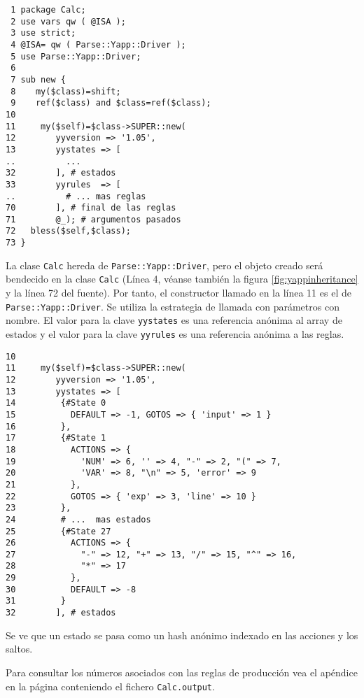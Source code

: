 \begin{verbatim}
 1 package Calc;
 2 use vars qw ( @ISA );
 3 use strict;
 4 @ISA= qw ( Parse::Yapp::Driver );
 5 use Parse::Yapp::Driver;
 6 
 7 sub new {
 8    my($class)=shift;
 9    ref($class) and $class=ref($class);
10 
11     my($self)=$class->SUPER::new( 
12        yyversion => '1.05',
13        yystates => [ 
..          ...
32        ], # estados
33        yyrules  => [
..       	# ... mas reglas
70        ], # final de las reglas
71        @_); # argumentos pasados
72   bless($self,$class);
73 }
\end{verbatim}

La clase \verb|Calc| hereda de \verb|Parse::Yapp::Driver|, pero el objeto creado
será bendecido en la clase \verb|Calc| (Línea 4, véanse también 
la figura \ref{fig:yappinheritance} 
y la línea 72 del fuente). 
Por tanto, el constructor llamado en la línea 11 es el de \verb|Parse::Yapp::Driver|.
Se utiliza la estrategia de llamada con parámetros con nombre. 
El valor para la clave \verb|yystates| es una referencia anónima 
al array de estados y el valor para la clave \verb|yyrules| 
es una referencia anónima a las reglas.
\begin{verbatim}
10 
11     my($self)=$class->SUPER::new( 
12        yyversion => '1.05',
13        yystates => [
14         {#State 0
15           DEFAULT => -1, GOTOS => { 'input' => 1 }
16         },
17         {#State 1
18           ACTIONS => {
19             'NUM' => 6, '' => 4, "-" => 2, "(" => 7,
20             'VAR' => 8, "\n" => 5, 'error' => 9
21           },
22           GOTOS => { 'exp' => 3, 'line' => 10 }
23         },
24         # ...  mas estados
25         {#State 27
26           ACTIONS => {
27             "-" => 12, "+" => 13, "/" => 15, "^" => 16,
28             "*" => 17
29           },
30           DEFAULT => -8
31         }
32        ], # estados
\end{verbatim}
Se ve que un estado se pasa como un hash anónimo indexado en las acciones
y los saltos. 

Para consultar los números asociados con las reglas de producción
vea el apéndice en la página \pageref{apendice:calcouput}
conteniendo el fichero \verb|Calc.output|.

